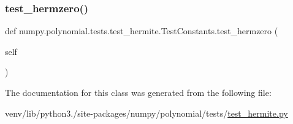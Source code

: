 \subsubsection{\texorpdfstring{test\+\_\+hermzero()}{test\_hermzero()}}
{\footnotesize\ttfamily def numpy.\+polynomial.\+tests.\+test\+\_\+hermite.\+Test\+Constants.\+test\+\_\+hermzero (\begin{DoxyParamCaption}\item[{}]{self }\end{DoxyParamCaption})}



The documentation for this class was generated from the following file\+:\begin{DoxyCompactItemize}
\item 
venv/lib/python3./site-\/packages/numpy/polynomial/tests/\hyperlink{test__hermite_8py}{test\+\_\+hermite.\+py}\end{DoxyCompactItemize}

